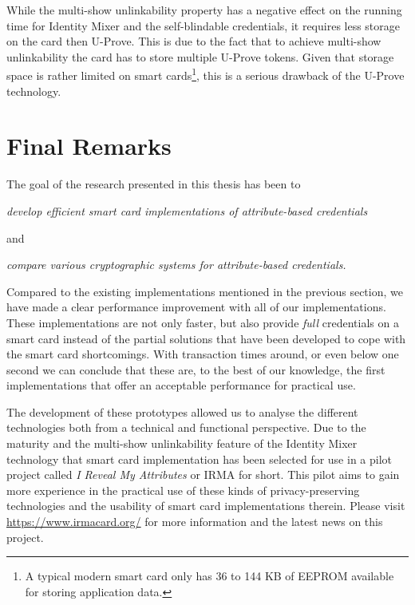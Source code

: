 While the multi-show unlinkability property has a negative effect on the running
time for Identity Mixer and the self-blindable credentials, it requires less
storage on the card then U-Prove. This is due to the fact that to achieve
multi-show unlinkability the card has to store multiple U-Prove tokens. Given
that storage space is rather limited on smart cards\footnote{A typical modern smart
card only has 36 to 144 KB of EEPROM available for storing application data.},
this is a serious drawback of the U-Prove technology.

\clearpage

\section{Final Remarks}

The goal of the research presented in this thesis has been to
\begin{center}\it
  develop efficient smart card implementations of attribute-based credentials
\end{center}
and
\begin{center}\it
  compare various cryptographic systems for attribute-based credentials.
\end{center}

Compared to the existing implementations mentioned in the previous section, we
have made a clear performance improvement with all of our implementations. These
implementations are not only faster, but also provide \emph{full} credentials
on a smart card instead of the partial solutions that have been developed to
cope with the smart card shortcomings. With transaction times around, or even
below one second we can conclude that these are, to the best of our knowledge,
the first implementations that offer an acceptable performance for practical
use.

The development of these prototypes allowed us to analyse the different
technologies both from a technical and functional perspective. Due to the
maturity and the multi-show unlinkability feature of the Identity Mixer
 technology that smart card implementation has been
selected for use in a pilot project called \emph{I Reveal My Attributes} or
IRMA  for short. This pilot aims to gain more experience in
the practical use of these kinds of privacy-preserving technologies and the
usability of smart card implementations therein. Please visit
\url{https://www.irmacard.org/} for more information and the latest news
on this project.

